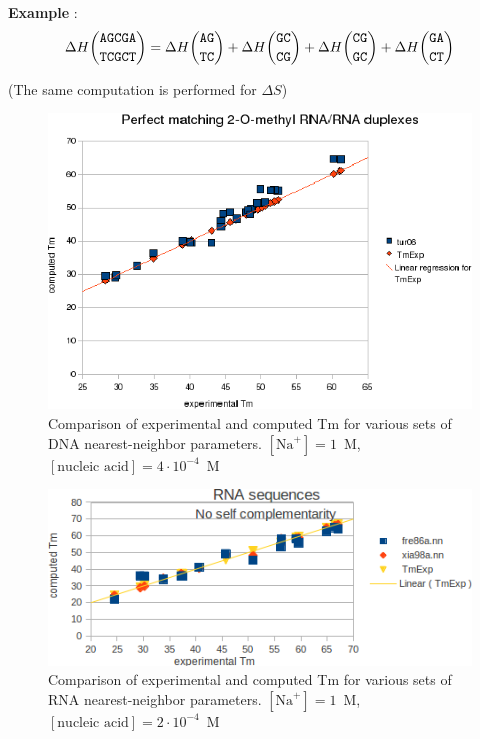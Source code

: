 \documentclass{article}
\begin{document}
\textbf{Example} :
\begin{multline*}
\Delta H {\mbox{\texttt{AGCGA}} \choose \mbox{\texttt{TCGCT}}} = 
\Delta H {\mbox{\texttt{AG}} \choose \mbox{\texttt{TC}} } + 
\Delta H {\mbox{\texttt{GC}} \choose \mbox{\texttt{CG}} } +
\Delta H {\mbox{\texttt{CG}} \choose \mbox{\texttt{GC}} } +
\Delta H {\mbox{\texttt{GA}} \choose \mbox{\texttt{CT}} }
\end{multline*}

       (The same computation is performed for $\Delta S$)
       
\begin{figure}[h]
\includegraphics[width=1\linewidth]{images/DNAPerfectlyMatching}
\caption{Comparison of experimental and computed Tm for various sets of
  DNA nearest-neighbor parameters. $[\mbox{Na}^+] = 1$~M, $[\mbox{nucleic acid}] = 4\cdot{}10^{-4}$~M}
\end{figure}

\begin{figure}[h!]
\includegraphics[width=1\linewidth]{images/RNAPerfectlyMatching}
\caption{Comparison of experimental and computed Tm for various sets of
  RNA nearest-neighbor parameters. $[\mbox{Na}^+] = 1$~M, $[\mbox{nucleic acid}] = 2\cdot{}10^{-4}$~M}
\end{figure}
\end{document}
